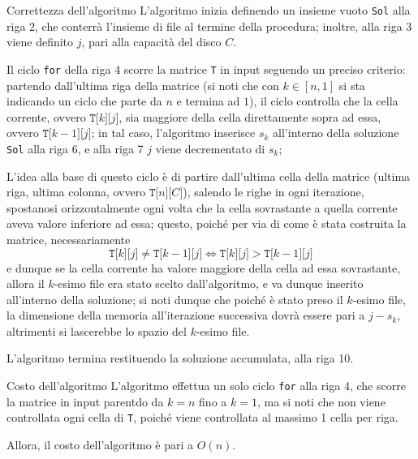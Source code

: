\documentclass[a4paper, 12pt]{report}
\begin{document}
    \begin{framedobs}{Correttezza dell'algoritmo}
        L'algoritmo inizia definendo un insieme vuoto \texttt{Sol} alla riga 2, che conterrà l'insieme di file al termine della procedura; inoltre, alla riga 3 viene definito $j$, pari alla capacità del disco $C$.

        Il ciclo \texttt{for} della riga 4 scorre la matrice \texttt{T} in input seguendo un preciso criterio: partendo dall'ultima riga della matrice (si noti che con $k \in [n, 1]$ si sta indicando un ciclo che parte da $n$ e termina ad $1$), il ciclo controlla che la cella corrente, ovvero $\texttt{T[}k\texttt{][}j\texttt{]}$, sia maggiore della cella direttamente sopra ad essa, ovvero $\texttt{T[}k - 1\texttt{][}j\texttt{]}$; in tal caso, l'algoritmo inserisce $s_k$ all'interno della soluzione \texttt{Sol} alla riga 6, e alla riga 7 $j$ viene decrementato di $s_k$;

        L'idea alla base di questo ciclo è di partire dall'ultima cella della matrice (ultima riga, ultima colonna, ovvero $\texttt{T[}n\texttt{][}C\texttt{]}$), salendo le righe in ogni iterazione, spostanosi orizzontalmente ogni volta che la cella sovrastante a quella corrente aveva valore inferiore ad essa; questo, poiché per via di come è stata costruita la matrice, necessariamente $$\texttt{T[}k\texttt{][}j\texttt{]} \neq \texttt{T[}k -1\texttt{][}j\texttt{]} \iff \texttt{T[}k\texttt{][}j\texttt{]} > \texttt{T[}k -1\texttt{][}j\texttt{]}$$ e dunque se la cella corrente ha valore maggiore della cella ad essa sovrastante, allora il $k$-esimo file era stato scelto dall'algoritmo, e va dunque inserito all'interno della soluzione; si noti dunque che poiché è stato preso il $k$-esimo file, la dimensione della memoria all'iterazione successiva dovrà essere pari a $j - s_k$, altrimenti si lascerebbe lo spazio del $k$-esimo file.

        L'algoritmo termina restituendo la soluzione accumulata, alla riga 10.
    \end{framedobs}

    \begin{framedobs}{Costo dell'algoritmo}
        L'algoritmo effettua un solo ciclo \texttt{for} alla riga 4, che scorre la matrice in input parentdo da $k = n$ fino a $k = 1$, ma si noti che non viene controllata ogni cella di \texttt{T}, poiché viene controllata al massimo 1 cella per riga.

        Allora, il costo dell'algoritmo è pari a $O(n)$.
    \end{framedobs}
\end{document}
